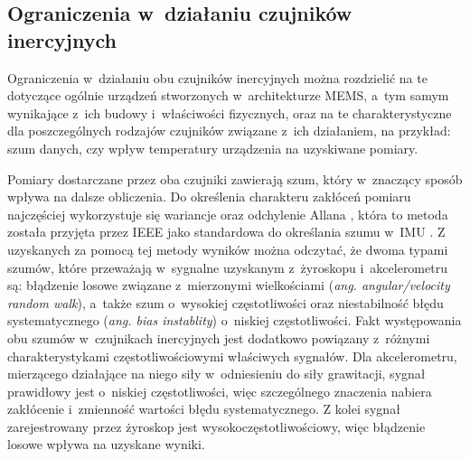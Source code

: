 \subsection{Ograniczenia w~działaniu czujników inercyjnych}
Ograniczenia w~działaniu obu czujników inercyjnych można rozdzielić na te dotyczące ogólnie urządzeń stworzonych w~architekturze MEMS, a~tym samym wynikające z~ich budowy i~właściwości fizycznych, oraz na te charakterystyczne dla poszczególnych rodzajów czujników związane z~ich działaniem, na przykład: szum danych, czy wpływ temperatury urządzenia na uzyskiwane pomiary.

Pomiary dostarczane przez oba czujniki zawierają szum, który w~znaczący sposób wpływa na dalsze obliczenia. Do określenia charakteru zakłóceń pomiaru najczęściej wykorzystuje się wariancje oraz odchylenie Allana \cite{Allan1966}, która to metoda została przyjęta przez IEEE jako standardowa do określania szumu w~IMU \cite{IeeeAccSpec}. Z uzyskanych za pomocą tej metody wyników można odczytać, że dwoma typami szumów, które przeważają w~sygnalne uzyskanym z~żyroskopu i~akcelerometru są: błądzenie losowe związane z~mierzonymi wielkościami (\emph{ang. angular/velocity random walk}), a~także szum o~wysokiej częstotliwości oraz niestabilność błędu systematycznego (\emph{ang. bias instablity}) o~niskiej częstotliwości. Fakt występowania obu szumów w~czujnikach inercyjnych jest dodatkowo powiązany z~różnymi charakterystykami częstotliwościowymi właściwych sygnałów. Dla akcelerometru, mierzącego działające na niego siły w~odniesieniu do siły grawitacji, sygnał prawidłowy jest o~niskiej częstotliwości, więc szczególnego znaczenia nabiera zakłócenie i~zmienność wartości błędu systematycznego. Z kolei sygnał zarejestrowany przez żyroskop jest wysokoczęstotliwościowy, więc błądzenie losowe wpływa na uzyskane wyniki.

